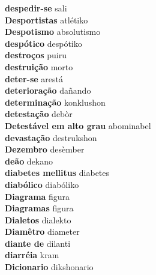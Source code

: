 \textbf{ despedir-se  } sali \\
\textbf{ Desportistas  } atlétiko \\
\textbf{ Despotismo  } absolutismo \\
\textbf{ despótico  } despótiko \\
\textbf{ destroços  } puiru \\
\textbf{ destruição  } morto \\
\textbf{ deter-se  } arestá \\
\textbf{ deterioração  } dañando \\
\textbf{ determinação  } konklushon \\
\textbf{ detestação  } debòr \\
\textbf{ Detestável em alto grau  } abominabel \\
\textbf{ devastação  } destrukshon \\
\textbf{ Dezembro  } desèmber \\
\textbf{ deão  } dekano \\
\textbf{ diabetes mellitus  } diabetes \\
\textbf{ diabólico  } diabóliko \\
\textbf{ Diagrama  } figura \\
\textbf{ Diagramas  } figura \\
\textbf{ Dialetos  } dialekto \\
\textbf{ Diamêtro  } diameter \\
\textbf{ diante de  } dilanti \\
\textbf{ diarréia  } kram \\
\textbf{ Dicionario  } dikshonario \\
